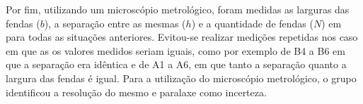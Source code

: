 Por fim, utilizando um microscópio metrológico, foram medidas as larguras das fendas ($b$), a separação entre as mesmas ($h$) e a quantidade de fendas ($N$) em para todas as situações anteriores. Evitou-se realizar medições repetidas nos caso em que as os valores medidos seriam iguais, como por exemplo de B4 a B6 em que a separação era idêntica e de A1 a A6, em que tanto a separação quanto a largura das fendas é igual. Para a utilização do microscópio metrológico, o grupo identificou a resolução do mesmo e paralaxe como incerteza.  


